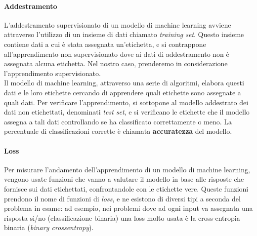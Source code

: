 \paragraph{Addestramento} L'addestramento supervisionato di un modello di machine learning avviene attraverso l'utilizzo di un insieme di dati chiamato \textit{training set}. Questo insieme contiene dati a cui è stata assegnata un'etichetta, e si contrappone all'apprendimento non supervisionato dove ai dati di addestramento non è assegnata alcuna etichetta. Nel nostro caso, prenderemo in considerazione l'apprendimento supervisionato.\\
Il modello di machine learning, attraverso una serie di algoritmi, elabora questi dati e le loro etichette cercando di apprendere quali etichette sono assegnate a quali dati. Per verificare l'apprendimento, si sottopone al modello addestrato dei dati non etichettati, denominati \textit{test set}, e si verificano le etichette che il modello assegna a tali dati controllando se ha classificato correttamente o meno. La percentuale di classificazioni corrette è chiamata \textbf{accuratezza} del modello.

\paragraph{Loss} Per misurare l'andamento dell'apprendimento di un modello di machine learning, vengono usate funzioni che vanno a valutare il modello in base alle risposte che fornisce sui dati etichettati, confrontandole con le etichette vere. Queste funzioni prendono il nome di funzioni di \textit{loss}, e ne esistono di diversi tipi a seconda del problema in esame: ad esempio, nei problemi dove ad ogni input va assegnata una risposta si/no (classificazione binaria) una loss molto usata è la cross-entropia binaria (\textit{binary crossentropy}).

